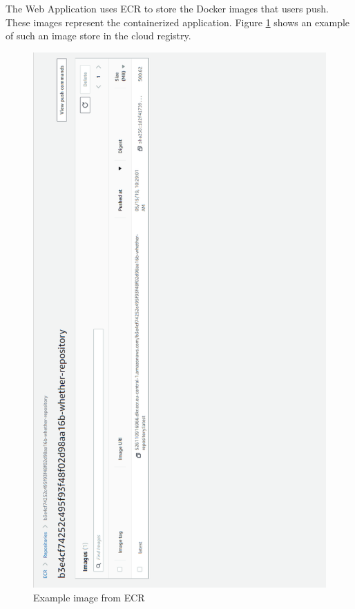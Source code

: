 The Web Application uses ECR to store the Docker images that users push. These images represent the containerized application. Figure \ref{fig:ecr} shows an example of such an image store in the cloud registry.

\begin{figure}[p]
	\centering
	\noindent
	\includegraphics[width=0.5\paperwidth]{./images/aws_resources/ECR.PNG}
	\caption{Example image from ECR}
	\label{fig:ecr}
\end{figure}

